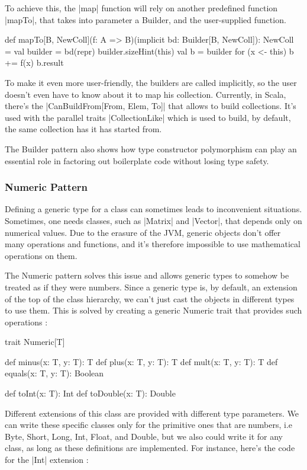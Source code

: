To achieve this, the |map| function will rely on another predefined function |mapTo|, that takes into parameter a Builder, and the user-supplied function.

\begin{lstlisting-nobreak}
 def mapTo[B, NewColl](f: A => B)(implicit bd: Builder[B, NewColl]): NewColl = {
   val builder = bd(repr)
   builder.sizeHint(this)
   val b = builder
   for (x <- this) b += f(x)
   b.result
 }
\end{lstlisting-nobreak}

To make it even more user-friendly, the builders are called implicitly, so the user doesn't even have to know about it to map his collection. Currently, in Scala, there's the |CanBuildFrom[From, Elem, To]| that allows to build collections. It's used with the parallel traits |CollectionLike| which is used to build, by default, the same collection has it has started from.

The Builder pattern also shows how type constructor polymorphism can play an essential role in factoring out boilerplate code without losing type safety.\cite{adriaan}

\subsubsection{Numeric Pattern}

Defining a generic type for a class can sometimes leads to inconvenient situations. Sometimes, one needs classes, such as |Matrix| and |Vector|, that depends only on numerical values. Due to the erasure of the JVM, generic objects don't offer many operations and functions, and it's therefore impossible to use mathematical operations on them.

The Numeric pattern solves this issue and allows generic types to somehow be treated as if they were numbers. Since a generic type is, by default, an extension of the top of the class hierarchy, we can't just cast the objects in different types to use them. This is solved by creating a generic Numeric trait that provides such operations :

\begin{lstlisting-nobreak}
 trait Numeric[T] {
   def minus(x: T, y: T): T
   def plus(x: T, y: T): T
   def mult(x: T, y: T): T
   def equals(x: T, y: T): Boolean

   def toInt(x: T): Int
   def toDouble(x: T): Double
 }
\end{lstlisting-nobreak}

Different extensions of this class are provided with different type parameters. We can write these specific classes only for the primitive ones that are numbers, i.e Byte, Short, Long, Int, Float, and Double, but we also could write it for any class, as long as these definitions are implemented. For instance, here's the code for the |Int| extension :

